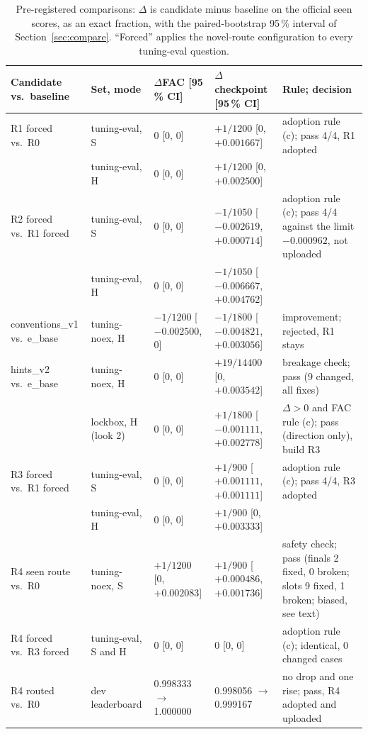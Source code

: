 \begin{table}[t]
\caption{Pre-registered comparisons: $\Delta$ is candidate minus baseline on the official seen scores, as an exact fraction, with the paired-bootstrap 95\,\% interval of Section~\ref{sec:compare}. ``Forced'' applies the novel-route configuration to every tuning-eval question.}
\label{tab:decisions}
\centering
\scriptsize
\setlength{\tabcolsep}{3pt}
\begin{tabular}{@{}llllp{5.4cm}@{}}
\toprule
Candidate vs.\ baseline & Set, mode & $\Delta$FAC [95\,\% CI] & $\Delta$checkpoint [95\,\% CI] & Rule; decision \\
\midrule
R1 forced vs.\ R0 & tuning-eval, S & 0 [0, 0] & $+1/1200$ [0, $+0.001667$] & adoption rule (c); pass 4/4, R1 adopted \\
 & tuning-eval, H & 0 [0, 0] & $+1/1200$ [0, $+0.002500$] & \\
R2 forced vs.\ R1 forced & tuning-eval, S & 0 [0, 0] & $-1/1050$ [$-0.002619$, $+0.000714$] & adoption rule (c); pass 4/4 against the limit $-0.000962$, not uploaded \\
 & tuning-eval, H & 0 [0, 0] & $-1/1050$ [$-0.006667$, $+0.004762$] & \\
conventions\_v1 vs.\ e\_base & tuning-noex, H & $-1/1200$ [$-0.002500$, 0] & $-1/1800$ [$-0.004821$, $+0.003056$] & improvement; rejected, R1 stays \\
hints\_v2 vs.\ e\_base & tuning-noex, H & 0 [0, 0] & $+19/14400$ [0, $+0.003542$] & breakage check; pass (9 changed, all fixes) \\
 & lockbox, H (look 2) & 0 [0, 0] & $+1/1800$ [$-0.001111$, $+0.002778$] & $\Delta>0$ and FAC rule (c); pass (direction only), build R3 \\
R3 forced vs.\ R1 forced & tuning-eval, S & 0 [0, 0] & $+1/900$ [$+0.001111$, $+0.001111$] & adoption rule (c); pass 4/4, R3 adopted \\
 & tuning-eval, H & 0 [0, 0] & $+1/900$ [0, $+0.003333$] & \\
R4 seen route vs.\ R0 & tuning-noex, S & $+1/1200$ [0, $+0.002083$] & $+1/900$ [$+0.000486$, $+0.001736$] & safety check; pass (finals 2 fixed, 0 broken; slots 9 fixed, 1 broken; biased, see text) \\
R4 forced vs.\ R3 forced & tuning-eval, S and H & 0 [0, 0] & 0 [0, 0] & adoption rule (c); identical, 0 changed cases \\
R4 routed vs.\ R0 & dev leaderboard & 0.998333 $\to$ 1.000000 & 0.998056 $\to$ 0.999167 & no drop and one rise; pass, R4 adopted and uploaded \\
\bottomrule
\end{tabular}
\end{table}
